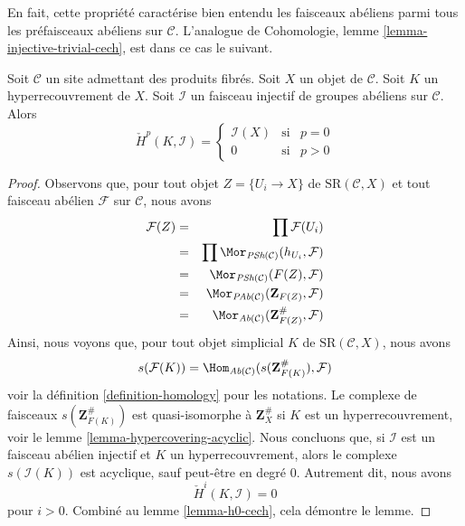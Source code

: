 \noindent
En fait, cette propriété caractérise bien entendu les faisceaux abéliens parmi tous
les préfaisceaux abéliens sur $\mathcal{C}$.
L'analogue de Cohomologie, lemme \ref{lemma-injective-trivial-cech},
est dans ce cas le suivant.

\begin{lemma}
\label{lemma-injective-trivial-cech}
Soit $\mathcal{C}$ un site admettant des produits fibrés.
Soit $X$ un objet de $\mathcal{C}$.
Soit $K$ un hyperrecouvrement de $X$.
Soit $\mathcal{I}$ un faisceau injectif de groupes abéliens sur $\mathcal{C}$.
Alors
$$
\check{H}^p(K, \mathcal{I}) =
\left\{
\begin{matrix}
\mathcal{I}(X) & \text{si} & p = 0 \\
0 & \text{si} & p > 0
\end{matrix}
\right.
$$
\end{lemma}

\begin{proof}
Observons que, pour tout objet $Z = \{U_i \to X\}$ de
$\text{SR}(\mathcal{C}, X)$ et tout faisceau abélien
$\mathcal{F}$ sur $\mathcal{C}$, nous avons
\begin{eqnarray*}
\mathcal{F}(Z)
& = &
\prod \mathcal{F}(U_i) \\
& = &
\prod \Mor_{\textit{PSh}(\mathcal{C})}(h_{U_i}, \mathcal{F})\\
& = &
\Mor_{\textit{PSh}(\mathcal{C})}(F(Z), \mathcal{F})\\
& = &
\Mor_{\textit{PAb}(\mathcal{C})}(\mathbf{Z}_{F(Z)}, \mathcal{F}) \\
& = &
\Mor_{\textit{Ab}(\mathcal{C})}(\mathbf{Z}_{F(Z)}^\#, \mathcal{F})
\end{eqnarray*}
Ainsi, nous voyons que, pour tout objet simplicial $K$ de
$\text{SR}(\mathcal{C}, X)$, nous avons
\begin{equation}
\label{equation-identify-cech}
s(\mathcal{F}(K))
=
\Hom_{\textit{Ab}(\mathcal{C})}(s(\mathbf{Z}_{F(K)}^\#), \mathcal{F})
\end{equation}
voir la définition \ref{definition-homology} pour les notations.
Le complexe de faisceaux $s(\mathbf{Z}_{F(K)}^\#)$ est quasi-isomorphe
à $\mathbf{Z}_X^\#$ si $K$ est un hyperrecouvrement, voir le
lemme \ref{lemma-hypercovering-acyclic}. Nous concluons
que, si $\mathcal{I}$ est un faisceau abélien injectif et
$K$ un hyperrecouvrement, alors le complexe $s(\mathcal{I}(K))$
est acyclique, sauf peut-être en degré $0$.
Autrement dit, nous avons
$$
\check{H}^i(K, \mathcal{I}) = 0
$$
pour $i > 0$. Combiné au lemme \ref{lemma-h0-cech}, cela démontre le lemme.
\end{proof}

